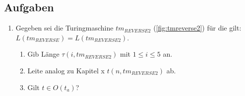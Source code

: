 
\subsection*{Aufgaben}

\begin{enumerate}
    \item Gegeben sei die Turingmaschine $tm_{REVERSE2}$ (\autoref{fig:tmreverse2}) für die gilt: $L(tm_{REVERSE}) = L(tm_{REVERSE2})$.
            \begin{enumerate}
                \item Gib Länge $\tau(i, tm_{REVERSE2})$ mit $1 \leq i \leq 5$ an.
                \item Leite analog zu Kapitel x $t(n, tm_{REVERSE2})$ ab.
                \item Gilt $t \in O(t_{a})$?
            \end{enumerate}
\end{enumerate}

